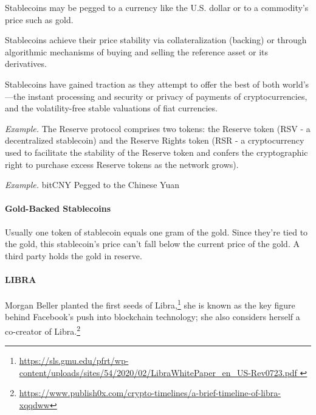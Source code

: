 Stablecoins may be pegged to a currency like the U.S. dollar or to a commodity's price such as gold.

Stablecoins achieve their price stability via collateralization (backing) or through algorithmic mechanisms of buying and selling the reference asset or its derivatives.

Stablecoins have gained traction as they attempt to offer the best of both world's—the instant processing and security or privacy of payments of cryptocurrencies, and the volatility-free stable valuations of fiat currencies.

\emph{Example.} The Reserve protocol comprises two tokens: the Reserve token (RSV - a decentralized stablecoin) and the Reserve Rights token (RSR - a cryptocurrency used to facilitate the stability of the Reserve token and confers the cryptographic right to purchase excess Reserve tokens as the network grows).

\emph{Example.} bitCNY Pegged to the Chinese Yuan


\paragraph{Gold-Backed Stablecoins}
Usually one token of stablecoin equals one gram of the gold. Since they're tied to the gold, this stablecoin's price can't fall below the current price of the gold. A third party holds the gold in reserve.

\paragraph{LIBRA}

Morgan Beller planted the first seeds of Libra,\footnote{\url{https://sls.gmu.edu/pfrt/wp-content/uploads/sites/54/2020/02/LibraWhitePaper_en_US-Rev0723.pdf
}} she is known as the key figure behind Facebook's push into blockchain technology; she also considers herself a co-creator of Libra.\footnote{\url{https://www.publish0x.com/crypto-timelines/a-brief-timeline-of-libra-xqqdww}}

